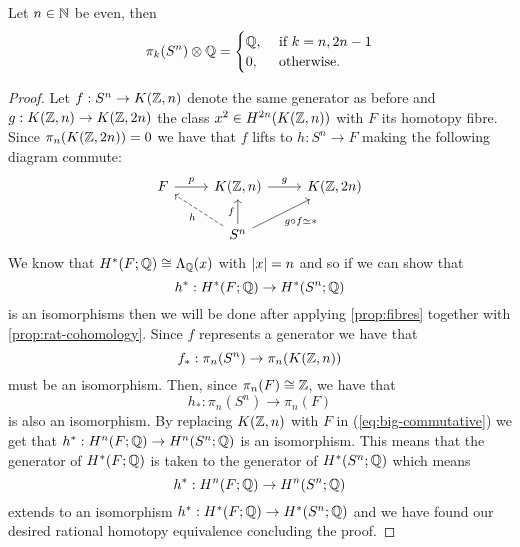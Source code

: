 \documentclass[../main.tex]{subfiles}
\begin{document}
\begin{theorem}
    Let \( n\in \mathbb{N} \) be even, then
    \begin{equation}
        \pi_k(S^n)\otimes \mathbb{Q} =
        \begin{cases}
            \mathbb{Q}, &\text{ if }k=n, 2n-1\\
            0, &\text{ otherwise.}
        \end{cases}
    \end{equation}
\end{theorem}
\begin{proof}
Let \( f:S^n\rightarrow K(\mathbb{Z}, n) \) denote the same generator as before
and \( g:K(\mathbb{Z}, n)\rightarrow K(\mathbb{Z}, 2n) \) the class \( x^2\in H^{2n}(K(\mathbb{Z}
, n)) \) with \( F \) its homotopy fibre. Since \( \pi_n(K(\mathbb{Z}, 2n))=0 \) 
we have that \( f \) lifts to \( h:S^n\rightarrow F \) making the
following diagram commute:
\begin{equation}
    \begin{tikzcd}
        F & {K(\Z, n)} & {K(\Z, 2n)} \\
        & {S^n}
        \arrow["{g\circ f\simeq *}"', from=2-2, to=1-3]
        \arrow["f", from=2-2, to=1-2]
        \arrow["g", from=1-2, to=1-3]
        \arrow["p", from=1-1, to=1-2]
        \arrow["h", dashed, from=2-2, to=1-1]
    \end{tikzcd}
\end{equation}
We know that \( H^*(F;\mathbb{Q})\cong \Lambda_{\mathbb{Q}}(x) \) with \( \lvert x\rvert=n \) 
and so if we can show that \[ h^*:H^*(F;\mathbb{Q})\rightarrow H^*(S^n; \mathbb{Q} ) \] is an
isomorphisms then we will be done after applying \cref{prop:fibres}
together with \cref{prop:rat-cohomology}. Since \( f \) represents
a generator we have that \[ f_*:\pi_n(S^n)\rightarrow \pi_n(K(\mathbb{Z}, n)) \]
must be an isomorphism. Then, since \( \pi_n(F)\cong\mathbb{Z} \), we have that
\[ h_*:\pi_n(S^n)\rightarrow \pi_n(F) \] is also an isomorphism. By
replacing \( K(\mathbb{Z}, n) \) with \( F \) in (\ref{eq:big-commutative}) we get 
that \( h^*:H^n(F;\mathbb{Q})\rightarrow
H^n(S^n;\mathbb{Q})\) is an isomorphism. This means that the generator of
\( H^*(F;\mathbb{Q}) \) is taken to the generator of \( H^*(S^n;\mathbb{Q}) \) which
means \[ h^*:H^n(F;\mathbb{Q})\rightarrow H^n(S^n;\mathbb{Q}) \] extends to an
isomorphism \( h^*:H^*(F;\mathbb{Q})\rightarrow
H^*(S^n;\mathbb{Q})\) and we have found our desired rational
homotopy equivalence concluding the proof.

\end{proof}
\end{document}
